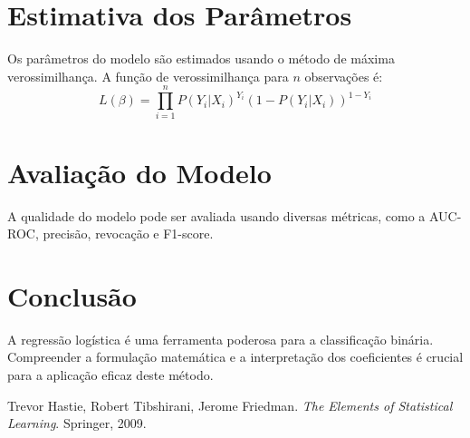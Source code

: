 \documentclass{article}
\begin{document}
\section{Estimativa dos Parâmetros}
Os parâmetros do modelo são estimados usando o método de máxima verossimilhança. A função de verossimilhança para \(n\) observações é:
\[
L(\beta) = \prod_{i=1}^n P(Y_i|X_i)^{Y_i} (1 - P(Y_i|X_i))^{1 - Y_i}
\]

\section{Avaliação do Modelo}
A qualidade do modelo pode ser avaliada usando diversas métricas, como a AUC-ROC, precisão, revocação e F1-score.

\section{Conclusão}
A regressão logística é uma ferramenta poderosa para a classificação binária. Compreender a formulação matemática e a interpretação dos coeficientes é crucial para a aplicação eficaz deste método.

\begin{thebibliography}{9}
Trevor Hastie, Robert Tibshirani, Jerome Friedman. \textit{The Elements of Statistical Learning}. Springer, 2009.
\end{thebibliography}
\end{document}
